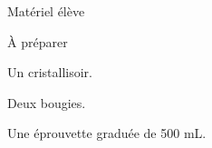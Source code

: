 
\begin{boiteMateriel}{Matériel élève}
\end{boiteMateriel}

\begin{boiteMateriel}{À préparer}
  \begin{listePoints}
    \item Un cristallisoir.
    \item Deux bougies.
    \item Une éprouvette graduée de 500 mL.
  \end{listePoints}
\end{boiteMateriel}